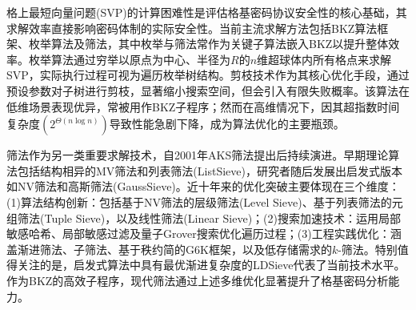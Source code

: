 \documentclass[12pt,a4paper]{article}
\numberwithin{equation}{section}
\begin{document}

格上最短向量问题(SVP)的计算困难性是评估格基密码协议安全性的核心基础，其求解效率直接影响密码体制的实际安全性。当前主流求解方法包括BKZ算法框架、枚举算法及筛法，其中枚举与筛法常作为关键子算法嵌入BKZ以提升整体效率。枚举算法通过穷举以原点为中心、半径为$R$的$n$维超球体内所有格点来求解SVP，实际执行过程可视为遍历枚举树结构。剪枝技术作为其核心优化手段，通过预设参数对子树进行剪枝，显著缩小搜索空间，但会引入有限失败概率。该算法在低维场景表现优异，常被用作BKZ子程序；然而在高维情况下，因其超指数时间复杂度$\left(2^{\Theta(n \log n)}\right)$导致性能急剧下降，成为算法优化的主要瓶颈。

筛法作为另一类重要求解技术，自2001年AKS筛法\cite{10.1145/380752.380857}提出后持续演进。早期理论算法包括结构相异的MV筛法和列表筛法(ListSieve)\cite{doi:10.1137/1.9781611973075.119}，研究者随后发展出启发式版本如NV筛法\cite{NguyenVidick+2008+181+207}和高斯筛法(GaussSieve)\cite{doi:10.1137/1.9781611973075.119}。近十年来的优化突破主要体现在三个维度：(1)算法结构创新：包括基于NV筛法的层级筛法(Level Sieve)\cite{wang2011improved,zhang2013three}、基于列表筛法的元组筛法(Tuple Sieve)\cite{bai2016tuple}，以及线性筛法(Linear Sieve)\cite{mukhopadhyay2021faster}；(2)搜索加速技术：运用局部敏感哈希\cite{laarhoven2015sieving}、局部敏感过滤\cite{becker2016new}及量子Grover搜索\cite{laarhoven2013solving}优化遍历过程；(3)工程实践优化：涵盖渐进筛法\cite{laarhoven2018progressive}、子筛法\cite{ducas2018shortest}、基于秩约简的G6K框架\cite{albrecht2019general}，以及低存储需求的$k$-筛法\cite{chailloux2023classical}。特别值得关注的是，启发式算法中具有最优渐进复杂度的LDSieve\cite{becker2016new}代表了当前技术水平。作为BKZ的高效子程序\cite{xia2022improved}，现代筛法通过上述多维优化显著提升了格基密码分析能力。
\end{document}
